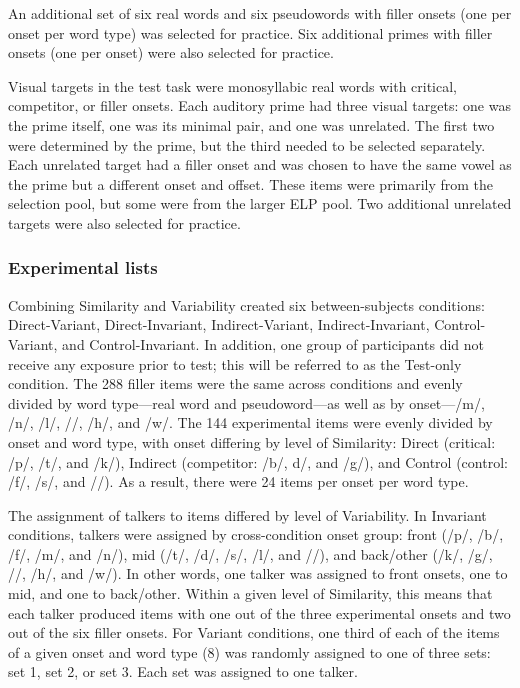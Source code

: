 \documentclass[preprint, 3p, authoryear]{elsarticle} %
\begin{document}
An additional set of six real words and six pseudowords with filler onsets (one per onset per word type) was selected for practice.
Six additional primes with filler onsets (one per onset) were also selected for practice.

Visual targets in the test task were monosyllabic real words with critical, competitor, or filler onsets.
Each auditory prime had three visual targets: one was the prime itself, one was its minimal pair, and one was unrelated.
The first two were determined by the prime, but the third needed to be selected separately.
Each unrelated target had a filler onset and was chosen to have the same vowel as the prime but a different onset and offset.
These items were primarily from the selection pool, but some were from the larger ELP pool.
Two additional unrelated targets were also selected for practice.

\hypertarget{methods-lists-1a}{%
\subsubsection{Experimental lists}\label{methods-lists-1a}}

Combining Similarity and Variability created six between-subjects conditions: Direct-Variant, Direct-Invariant, Indirect-Variant, Indirect-Invariant, Control-Variant, and Control-Invariant.
In addition, one group of participants did not receive any exposure prior to test; this will be referred to as the Test-only condition.
The 288 filler items were the same across conditions and evenly divided by word type---real word and pseudoword---as well as by onset---/m/, /n/, /l/, //, /h/, and /w/.
The 144 experimental items were evenly divided by onset and word type, with onset differing by level of Similarity: Direct (critical: /p/, /t/, and /k/), Indirect (competitor: /b/, d/, and /g/), and Control (control: /f/, /s/, and //).
As a result, there were 24 items per onset per word type.

The assignment of talkers to items differed by level of Variability.
In Invariant conditions, talkers were assigned by cross-condition onset group: front (/p/, /b/, /f/, /m/, and /n/), mid (/t/, /d/, /s/, /l/, and //), and back/other (/k/, /g/, //, /h/, and /w/).
In other words, one talker was assigned to front onsets, one to mid, and one to back/other.
Within a given level of Similarity, this means that each talker produced items with one out of the three experimental onsets and two out of the six filler onsets.
For Variant conditions, one third of each of the items of a given onset and word type (8) was randomly assigned to one of three sets: set 1, set 2, or set 3.
Each set was assigned to one talker.
\end{document}
